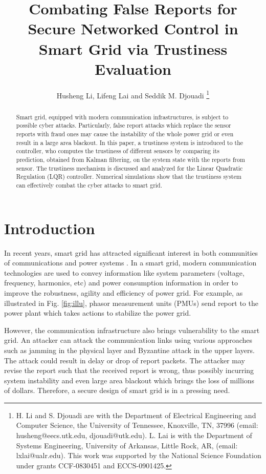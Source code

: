 \documentclass[journal,10pt,twocolumn]{IEEEtran}
\begin{document}
\title{Combating False Reports for Secure Networked Control in Smart Grid via Trustiness Evaluation}
\author{Husheng Li, Lifeng Lai and Seddik M. Djouadi
\thanks{H. Li and S. Djouadi are with the Department of Electrical Engineering and Computer Science, the University of Tennessee, Knoxville, TN, 37996 (email:
husheng@eecs.utk.edu, djouadi@utk.edu). L. Lai is with the Department of Systems Engineering, University of Arkansas, Little Rock, AR, (email: lxlai@ualr.edu). This work was supported by the National
Science Foundation under grants CCF-0830451 and ECCS-0901425.}}

\maketitle

\begin{abstract}
Smart grid, equipped with modern communication infrastructures, is subject to possible cyber attacks. Particularly, false report attacks which replace the sensor reports with fraud ones may cause the instability of the whole power grid or even result in a large area blackout. In this paper, a trustiness system is introduced to the controller, who computes the trustiness of different sensors by comparing its prediction, obtained from Kalman filtering, on the system state with the reports from sensor. The trustiness mechanism is discussed and analyzed for the Linear Quadratic Regulation (LQR) controller. Numerical simulations show that the trustiness system can effectively combat the cyber attacks to smart grid.
\end{abstract}


\section{Introduction}
In recent years, smart grid has attracted significant interest in both communities of communications and power systems \cite{ISO2009}. In a smart grid, modern communication technologies are used to convey information like system parameters (voltage, frequency, harmonics, etc) and power consumption information in order to improve the robustness, agility and efficiency of power grid. For example, as illustrated in Fig. \ref{fig:illu}, phasor measurement units (PMUs) send report to the power plant which takes actions to stabilize the power grid.

However, the communication infrastructure also brings vulnerability to the smart grid. An attacker can attack the communication links using various approaches such as jamming in the physical layer and Byzantine attack in the upper layers. The attack could result in delay or drop of report packets. The attacker may revise the report such that the received report is wrong, thus possibly incurring system instability and even large area blackout which brings the loss of millions of dollars. Therefore, a secure design of smart grid is in a pressing need.
\end{document}
